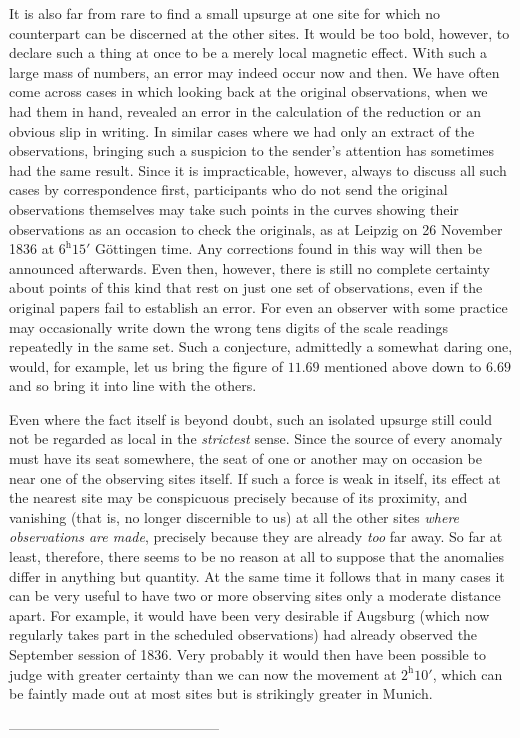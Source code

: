 It is also far from rare to find a small upsurge at one site for which no counterpart can be discerned at the other sites. It would be too bold, however, to declare such a thing at once to be a merely local magnetic
effect. With such a large mass of numbers, an error may indeed occur now and then. We have often come across cases in which looking back at the original observations, when we had them in hand, revealed an error in the calculation of the reduction or an obvious slip in writing. In similar cases where we had only an extract of the observations, bringing such a suspicion to the sender’s attention has sometimes had the same result. Since it is impracticable, however, always to discuss all such cases by correspondence first, participants who do not send the original observations themselves may take such points in the curves showing their observations as an occasion to check the originals, as at Leipzig on 26 November 1836 at $6^{\mathrm h}15'$ Göttingen time. Any corrections found in this way will then be announced afterwards. Even then, however, there is still no complete certainty about points of this kind that rest on just one set of observations, even if the original papers fail to establish an error. For even an observer with some practice may occasionally write down the wrong tens digits of the scale readings repeatedly in the same set. Such a conjecture, admittedly a somewhat daring one, would, for example, let us bring the figure of $11.69$ mentioned above down to $6.69$ and so bring it into line with the others.

Even where the fact itself is beyond doubt, such an isolated upsurge still could not be regarded as local in the \textit{strictest} sense. Since the source of every anomaly must have its seat somewhere, the seat of one or another may on occasion be near one of the observing sites itself. If such a force is weak in itself, its effect at the nearest site may be conspicuous precisely because of its proximity, and vanishing (that is, no longer discernible to us) at all the other sites \textit{where observations are made}, precisely because they are already \textit{too} far away. So far at least, therefore, there seems to be no reason at all to suppose that the anomalies differ in anything but quantity. At the same time it follows that in many cases it can be very useful to have two or more observing sites only a moderate distance apart. For example, it would have been very desirable if Augsburg (which now regularly takes part in the scheduled observations) had already observed the September session of
1836. Very probably it would then have been possible to judge with greater certainty than we can now the movement at $2^{\mathrm h}10'$, which can be faintly made out at most sites but is strikingly greater in Munich.
\begin{center}\small
---\enspace---\enspace---\enspace---\enspace---\enspace---\enspace---\enspace---\enspace---\enspace---\enspace---\enspace---\enspace---\enspace---\enspace---
\end{center}

